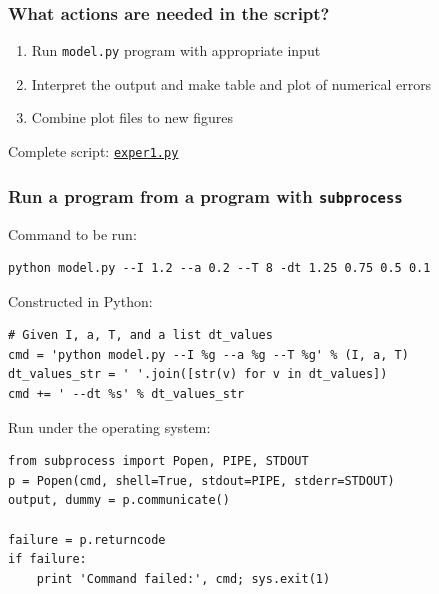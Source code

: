 \documentclass{beamer}
\begin{document}
\begin{frame}
\frametitle{What actions are needed in the script?}

\begin{enumerate}
\item Run \texttt{model.py} program with appropriate input

\item Interpret the output and make table and plot of numerical errors

\item Combine plot files to new figures
\end{enumerate}

\noindent
Complete script: \href{{http://tinyurl.com/nc4upel/report_generation/exper1.py}}{\nolinkurl{exper1.py}}
\end{frame}

\begin{frame}
\frametitle{Run a program from a program with \texttt{subprocess}}


Command to be run:

\begin{verbatim}
python model.py --I 1.2 --a 0.2 --T 8 -dt 1.25 0.75 0.5 0.1
\end{verbatim}

Constructed in Python:

\begin{verbatim}
# Given I, a, T, and a list dt_values
cmd = 'python model.py --I %g --a %g --T %g' % (I, a, T)
dt_values_str = ' '.join([str(v) for v in dt_values])
cmd += ' --dt %s' % dt_values_str
\end{verbatim}

Run under the operating system:

\begin{verbatim}
from subprocess import Popen, PIPE, STDOUT
p = Popen(cmd, shell=True, stdout=PIPE, stderr=STDOUT)
output, dummy = p.communicate()

failure = p.returncode
if failure:
    print 'Command failed:', cmd; sys.exit(1)
\end{verbatim}
\end{frame}
\end{document}
